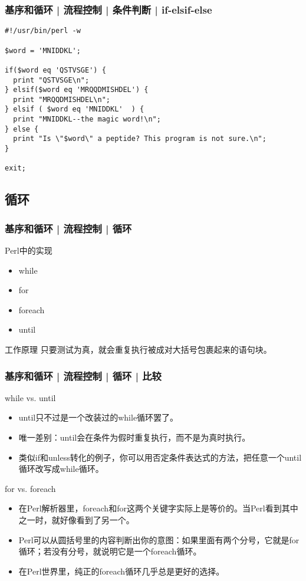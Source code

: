 \begin{frame}[fragile]
  \frametitle{基序和循环 | 流程控制 | 条件判断 | \alert{if-elsif-else}}
  \vspace{-0.5em}
\begin{lstlisting}
#!/usr/bin/perl -w

$word = 'MNIDDKL';

if($word eq 'QSTVSGE') {
  print "QSTVSGE\n";
} elsif($word eq 'MRQQDMISHDEL') {
  print "MRQQDMISHDEL\n";
} elsif ( $word eq 'MNIDDKL'  ) {
  print "MNIDDKL--the magic word!\n";
} else {
  print "Is \"$word\" a peptide? This program is not sure.\n";
}

exit;
\end{lstlisting}
\end{frame}

\subsection{循环}
\begin{frame}
  \frametitle{基序和循环 | 流程控制 | 循环}
  \begin{block}{\alert{Perl中的实现}}
    \begin{itemize}
      \item while
      \item for
      \item foreach
      \item until
    \end{itemize}
  \end{block}
  \pause
  \begin{block}{工作原理}
    只要测试为真，就会重复执行被成对大括号包裹起来的语句块。
  \end{block}
\end{frame}

\begin{frame}
  \frametitle{基序和循环 | 流程控制 | 循环 | 比较}
  \begin{block}{while vs. until}
    \begin{itemize}
      \item until只不过是一个改装过的while循环罢了。
      \item 唯一差别：until会在条件为假时重复执行，而不是为真时执行。
      \item 类似if和unless转化的例子，你可以用否定条件表达式的方法，把任意一个until循环改写成while循环。
    \end{itemize}
  \end{block}
  \pause
  \begin{block}{for vs. foreach}
    \begin{itemize}
      \item 在Perl解析器里，foreach和for这两个关键字实际上是等价的。当Perl看到其中之一时，就好像看到了另一个。
      \item Perl可以从圆括号里的内容判断出你的意图：如果里面有两个分号，它就是for循环；若没有分号，就说明它是一个foreach循环。
      \item 在Perl世界里，纯正的foreach循环几乎总是更好的选择。
    \end{itemize}
  \end{block}
\end{frame}

